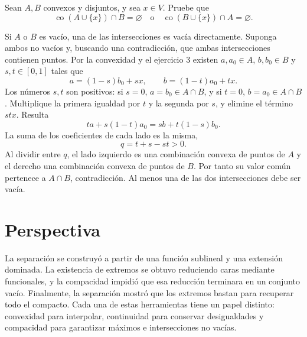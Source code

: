 \begin{ejercicio}
Sean $A,B$ convexos y disjuntos, y sea $x\in V$. Pruebe que
\[
 \operatorname{co}(A\cup\{x\})\cap B=\varnothing
 \quad\text{o}\quad
 \operatorname{co}(B\cup\{x\})\cap A=\varnothing.
\]
\end{ejercicio}
\begin{solucion}
Si $A$ o $B$ es vacío, una de las intersecciones es vacía directamente. Suponga ambos no vacíos y, buscando una contradicción, que ambas intersecciones contienen puntos. Por la convexidad y el ejercicio 3 existen $a,a_0\in A$, $b,b_0\in B$ y $s,t\in[0,1]$ tales que
\[
 a=(1-s)b_0+sx,\qquad b=(1-t)a_0+tx.
\]
Los números $s,t$ son positivos: si $s=0$, $a=b_0\in A\cap B$, y si $t=0$, $b=a_0\in A\cap B$. Multiplique la primera igualdad por $t$ y la segunda por $s$, y elimine el término $stx$. Resulta
\[
 ta+s(1-t)a_0=sb+t(1-s)b_0.
\]
La suma de los coeficientes de cada lado es la misma,
\[
 q=t+s-st>0.
\]
Al dividir entre $q$, el lado izquierdo es una combinación convexa de puntos de $A$ y el derecho una combinación convexa de puntos de $B$. Por tanto su valor común pertenece a $A\cap B$, contradicción. Al menos una de las dos intersecciones debe ser vacía.
\end{solucion}

\section{Perspectiva}
La separación se construyó a partir de una función sublineal y una extensión dominada. La existencia de extremos se obtuvo reduciendo caras mediante funcionales, y la compacidad impidió que esa reducción terminara en un conjunto vacío. Finalmente, la separación mostró que los extremos bastan para recuperar todo el compacto. Cada una de estas herramientas tiene un papel distinto: convexidad para interpolar, continuidad para conservar desigualdades y compacidad para garantizar máximos e intersecciones no vacías.

